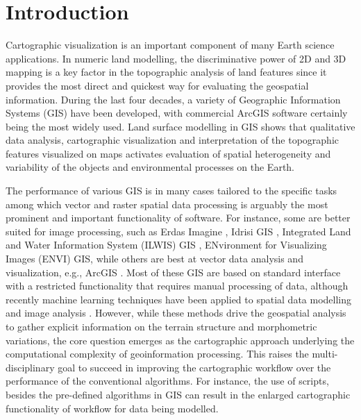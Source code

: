 \documentclass[land,article,submit,pdftex,moreauthors]{Definitions/mdpi}
\begin{document}
\section{Introduction}

Cartographic visualization is an important component of many Earth science applications. In numeric land modelling, the discriminative power of 2D and 3D mapping is a key factor in the topographic analysis of land features since it provides the most direct and quickest way for evaluating the geospatial information. During the last four decades, a variety of Geographic Information Systems (GIS) have been developed, with commercial ArcGIS software certainly being the most widely used. Land surface modelling in GIS shows that qualitative data analysis, cartographic visualization and interpretation of the topographic features visualized on maps activates evaluation of spatial heterogeneity and variability of the objects and environmental processes on the Earth. 

The performance of various GIS is in many cases tailored to the specific tasks among which vector and raster spatial data processing is arguably the most prominent and important functionality of software. For instance, some are better suited for image processing, such as Erdas Imagine \cite{IWAHASHI2010202}, Idrisi GIS \cite{land10040379,AYALEW200515}, Integrated Land and Water Information System (ILWIS) GIS \cite{BABIKER2005127}, ENvironment for Visualizing Images (ENVI) GIS, while others are best at vector data analysis and visualization, e.g., ArcGIS \cite{OHTA2022108201,IKEMI2017115,IWAHASHI201229,NAKAYAMA2023110243,HANAOKA2014274}.
Most of these GIS are based on standard interface with a restricted functionality that requires manual processing of data, although recently machine learning techniques have been applied to spatial data modelling \cite{THONGTHAMMACHART2022105447} and image analysis \cite{ALIFU2020107365,CARRASCO2022277}. However, while these methods drive the geospatial analysis to gather explicit information on the terrain structure and morphometric variations, the core question emerges as the cartographic approach underlying the computational complexity of geoinformation processing. This raises the multi-disciplinary goal to succeed in improving the cartographic workflow over the performance of the conventional algorithms. For instance, the use of scripts, besides the pre-defined algorithms in GIS can result in the enlarged cartographic functionality of workflow for data being modelled. 
\end{document}
